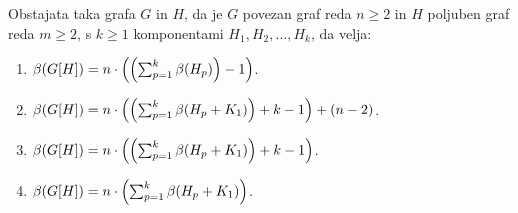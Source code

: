 \documentclass[mat1, tisk]{fmfdelo}
\newcommand{\1}{(1, 1, ..., 1)}
\newcommand{\2}{(2, 2, ..., 2)}
\begin{document}
    \begin{izrek} \label{izrek:primeri_mdim_komp}
    Obstajata taka grafa $G$ in $H$, da je $G$ povezan graf reda $n \geq 2$ in $H$ poljuben graf 
    reda $m \geq 2$, s $k \geq 1$ komponentami $H_1, H_2, \dots , H_k$, da velja:
    \begin{enumerate}
        \item $\beta(G[H]) = n \cdot \Bigl ( \Bigl ( \sum_{p=1}^{k} \beta(H_p) \Bigr )  - 1  \Bigr )$.
        \item $\beta(G[H]) = n \cdot \Bigl ( \Bigl ( \sum_{p=1}^{k} \beta(H_p + K_1) \Bigr ) + k - 1 
         \Bigr ) + (n-2)$.
        \item $\beta(G[H]) = n \cdot \Bigl ( \Bigl ( \sum_{p=1}^{k} \beta(H_p + K_1) \Bigr ) + k - 1  
        \Bigr )$.
        \item $\beta(G[H]) = n \cdot \Bigl ( \sum_{p=1}^{k} \beta(H_p + K_1) \Bigr ) $.
    \end{enumerate}
    \end{izrek}
    
\end{document}
